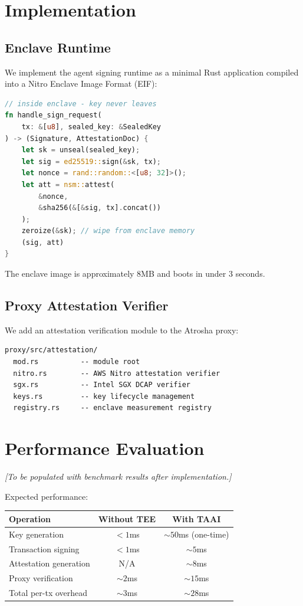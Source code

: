 \documentclass[conference]{IEEEtran}
\begin{document}
\section{Implementation}

\subsection{Enclave Runtime}

We implement the agent signing runtime as a minimal Rust application compiled into a Nitro Enclave Image Format (EIF):

\begin{lstlisting}[basicstyle=\ttfamily\small, frame=single, language=Rust]
// inside enclave - key never leaves
fn handle_sign_request(
    tx: &[u8], sealed_key: &SealedKey
) -> (Signature, AttestationDoc) {
    let sk = unseal(sealed_key);
    let sig = ed25519::sign(&sk, tx);
    let nonce = rand::random::<[u8; 32]>();
    let att = nsm::attest(
        &nonce,
        &sha256(&[&sig, tx].concat())
    );
    zeroize(&sk); // wipe from enclave memory
    (sig, att)
}
\end{lstlisting}

The enclave image is approximately 8MB and boots in under 3 seconds.

\subsection{Proxy Attestation Verifier}

We add an attestation verification module to the Atrosha proxy:

\begin{lstlisting}[basicstyle=\ttfamily\small, frame=single]
proxy/src/attestation/
  mod.rs          -- module root
  nitro.rs        -- AWS Nitro attestation verifier
  sgx.rs          -- Intel SGX DCAP verifier
  keys.rs         -- key lifecycle management
  registry.rs     -- enclave measurement registry
\end{lstlisting}

\section{Performance Evaluation}

\textit{[To be populated with benchmark results after implementation.]}

Expected performance:
\begin{center}
\begin{tabular}{lcc}
\toprule
\textbf{Operation} & \textbf{Without TEE} & \textbf{With TAAI} \\
\midrule
Key generation & $<1$ms & $\sim 50$ms (one-time) \\
Transaction signing & $<1$ms & $\sim 5$ms \\
Attestation generation & N/A & $\sim 8$ms \\
Proxy verification & $\sim 2$ms & $\sim 15$ms \\
\midrule
Total per-tx overhead & $\sim 3$ms & $\sim 28$ms \\
\bottomrule
\end{tabular}
\end{center}
\end{document}
